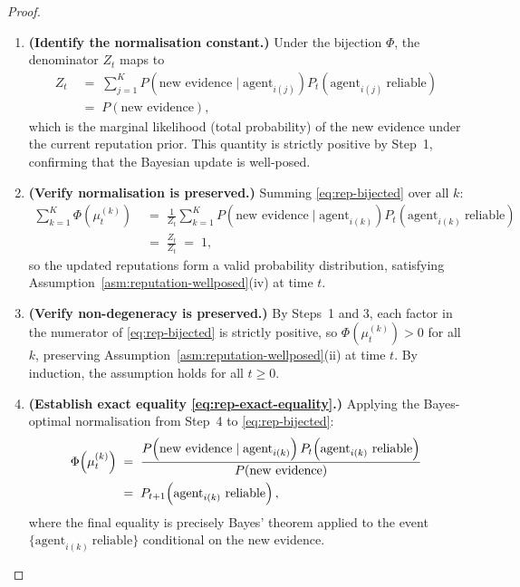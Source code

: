 \documentclass[12pt,openany]{book}
\numberwithin{equation}{chapter}
\theoremstyle{plain}
\theoremstyle{definition}
\theoremstyle{remark}
\begin{document}
\begin{proof}
\begin{enumerate}
  \item \textbf{(Identify the normalisation constant.)}
        Under the bijection $\Phi$, the denominator $Z_t$ maps to
        \begin{align}
          Z_t
          &\;=\;
          \sum_{j=1}^{K}
          P\!\left(\text{new evidence} \mid
            \text{agent}_{i(j)}\right)
          P_t\!\left(\text{agent}_{i(j)}\ \text{reliable}\right)
          \nonumber\\
          &\;=\;
          P\!\left(\text{new evidence}\right),
          \label{eq:rep-marginal}
        \end{align}
        which is the marginal likelihood (total probability) of the
        new evidence under the current reputation prior.  This
        quantity is strictly positive by Step~1, confirming that
        the Bayesian update is well-posed.

  \item \textbf{(Verify normalisation is preserved.)}
        Summing \eqref{eq:rep-bijected} over all $k$:
        \begin{align}
          \sum_{k=1}^{K}
          \Phi\!\left(\mu_t^{(k)}\right)
          &\;=\;
          \frac{1}{Z_t}
          \sum_{k=1}^{K}
          P\!\left(\text{new evidence} \mid
            \text{agent}_{i(k)}\right)
          P_t\!\left(\text{agent}_{i(k)}\ \text{reliable}\right)
          \nonumber\\
          &\;=\;
          \frac{Z_t}{Z_t}
          \;=\; 1,
          \label{eq:rep-norm-preserved}
        \end{align}
        so the updated reputations form a valid probability
        distribution, satisfying
        Assumption~\ref{asm:reputation-wellposed}(iv) at time $t$.

  \item \textbf{(Verify non-degeneracy is preserved.)}
        By Steps~1 and 3, each factor in the numerator of
        \eqref{eq:rep-bijected} is strictly positive, so
        $\Phi(\mu_t^{(k)}) > 0$ for all $k$, preserving
        Assumption~\ref{asm:reputation-wellposed}(ii) at time $t$.
        By induction, the assumption holds for all $t \geq 0$.

  \item \textbf{(Establish exact equality \eqref{eq:rep-exact-equality}.)}
        Applying the Bayes-optimal normalisation from Step~4 to
        \eqref{eq:rep-bijected}:
        \begin{align}
          \Phi\!\left(\mu_t^{(k)}\right)
          &\;=\;
          \frac{%
            P\!\left(\text{new evidence} \mid
              \text{agent}_{i(k)}\right)
            P_t\!\left(\text{agent}_{i(k)}\ \text{reliable}\right)}
               {P\!\left(\text{new evidence}\right)}
          \nonumber\\
          &\;=\;
          P_{t+1}\!\left(\text{agent}_{i(k)}\ \text{reliable}\right),
          \label{eq:rep-bayes}
        \end{align}
        where the final equality is precisely Bayes' theorem
        applied to the event
        $\{\text{agent}_{i(k)}\ \text{reliable}\}$
        conditional on the new evidence.


\end{enumerate}
\end{proof}
\end{document}
